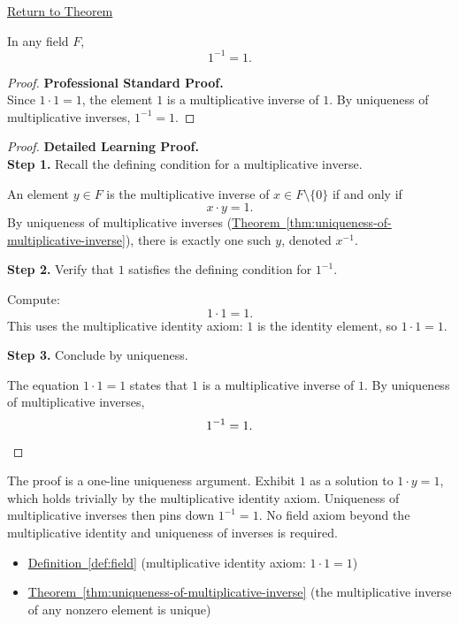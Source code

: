 \newpage
{}
\label{prf:one-inverse-is-one}

\begin{remark*}[Return]
\hyperref[thm:one-inverse-is-one]{Return to Theorem}
\end{remark*}

\begin{theorem*}
In any field $F$,
\[
1^{-1} = 1.
\]
\end{theorem*}

\begin{proof}
\textbf{Professional Standard Proof.}~\\
Since $1\cdot 1 = 1$, the element $1$ is a multiplicative inverse of $1$.
By uniqueness of multiplicative inverses, $1^{-1} = 1$.
\end{proof}

\begin{proof}
\textbf{Detailed Learning Proof.}~\\

\textbf{Step 1.} Recall the defining condition for a multiplicative inverse.

An element $y\in F$ is the multiplicative inverse of $x\in F\setminus\{0\}$
if and only if
\[
x\cdot y = 1.
\]
By uniqueness of multiplicative inverses
(\hyperref[thm:uniqueness-of-multiplicative-inverse]{Theorem~\ref*{thm:uniqueness-of-multiplicative-inverse}}),
there is exactly one such $y$, denoted $x^{-1}$.

\textbf{Step 2.} Verify that $1$ satisfies the defining condition for $1^{-1}$.

Compute:
\[
1\cdot 1 = 1.
\]
This uses the multiplicative identity axiom: $1$ is the identity element,
so $1\cdot 1 = 1$.

\textbf{Step 3.} Conclude by uniqueness.

The equation $1\cdot 1 = 1$ states that $1$ is a multiplicative inverse
of $1$.  By uniqueness of multiplicative inverses,
\[
1^{-1} = 1. \qedhere
\]
\end{proof}

\begin{remark*}
The proof is a one-line uniqueness argument.  Exhibit $1$ as a solution to
$1\cdot y = 1$, which holds trivially by the multiplicative identity axiom.
Uniqueness of multiplicative inverses then pins down $1^{-1} = 1$.  No field
axiom beyond the multiplicative identity and uniqueness of inverses is
required.
\end{remark*}

\begin{dependencies}
\begin{itemize}
  \item \hyperref[def:field]{Definition~\ref*{def:field}}
        \textnormal{(multiplicative identity axiom: $1\cdot 1 = 1$)}
  \item \hyperref[thm:uniqueness-of-multiplicative-inverse]{Theorem~\ref*{thm:uniqueness-of-multiplicative-inverse}}
        \textnormal{(the multiplicative inverse of any nonzero element is unique)}
\end{itemize}
\end{dependencies}
